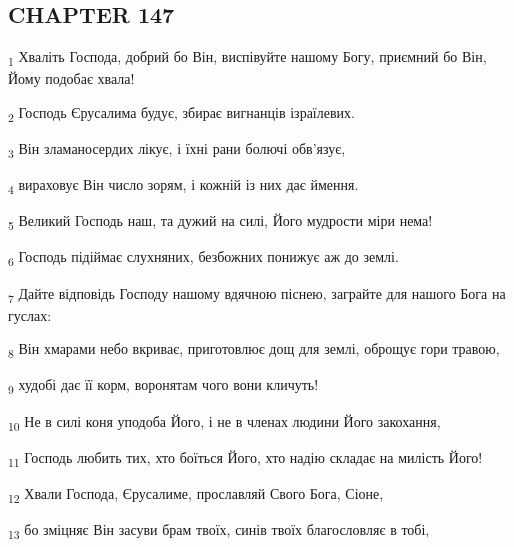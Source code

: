\subsection{CHAPTER 147}
\begin{tcolorbox}
\textsubscript{1} Хваліть Господа, добрий бо Він, виспівуйте нашому Богу, приємний бо Він, Йому подобає хвала!
\end{tcolorbox}
\begin{tcolorbox}
\textsubscript{2} Господь Єрусалима будує, збирає вигнанців ізраїлевих.
\end{tcolorbox}
\begin{tcolorbox}
\textsubscript{3} Він зламаносердих лікує, і їхні рани болючі обв'язує,
\end{tcolorbox}
\begin{tcolorbox}
\textsubscript{4} вираховує Він число зорям, і кожній із них дає ймення.
\end{tcolorbox}
\begin{tcolorbox}
\textsubscript{5} Великий Господь наш, та дужий на силі, Його мудрости міри нема!
\end{tcolorbox}
\begin{tcolorbox}
\textsubscript{6} Господь підіймає слухняних, безбожних понижує аж до землі.
\end{tcolorbox}
\begin{tcolorbox}
\textsubscript{7} Дайте відповідь Господу нашому вдячною піснею, заграйте для нашого Бога на гуслах:
\end{tcolorbox}
\begin{tcolorbox}
\textsubscript{8} Він хмарами небо вкриває, приготовлює дощ для землі, оброщує гори травою,
\end{tcolorbox}
\begin{tcolorbox}
\textsubscript{9} худобі дає її корм, воронятам чого вони кличуть!
\end{tcolorbox}
\begin{tcolorbox}
\textsubscript{10} Не в силі коня уподоба Його, і не в членах людини Його закохання,
\end{tcolorbox}
\begin{tcolorbox}
\textsubscript{11} Господь любить тих, хто боїться Його, хто надію складає на милість Його!
\end{tcolorbox}
\begin{tcolorbox}
\textsubscript{12} Хвали Господа, Єрусалиме, прославляй Свого Бога, Сіоне,
\end{tcolorbox}
\begin{tcolorbox}
\textsubscript{13} бо зміцняє Він засуви брам твоїх, синів твоїх благословляє в тобі,
\end{tcolorbox}
